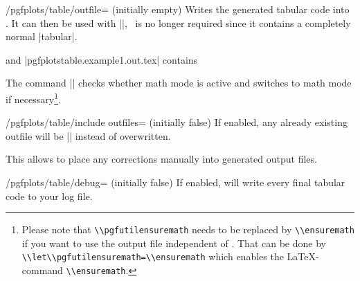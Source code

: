 \begin{key}{/pgfplots/table/outfile= (initially empty)}
	Writes the generated tabular code into . It can then be used with ||, \PGFPlotstable\ is no longer required since it contains a completely normal |tabular|.
\begin{codeexample}[]
\end{codeexample}
and |pgfplotstable.example1.out.tex| contains


The command |\pgfutilensuremath| checks whether math mode is active and switches to math mode if necessary\footnote{Please note that \lstinline{\\pgfutilensuremath} needs to be replaced by \lstinline{\\ensuremath} if you want to use the output file independent of \PGF. That can be done by \lstinline{\\let\\pgfutilensuremath=\\ensuremath} which enables the \LaTeX-command \lstinline{\\ensuremath}.}.
\end{key}

\begin{key}{/pgfplots/table/include outfiles= (initially false)}
	If enabled, any already existing outfile will be || instead of overwritten.
\begin{codeexample}
\end{codeexample}
	This allows to place any corrections manually into generated output files.
\end{key}

\begin{key}{/pgfplots/table/debug= (initially false)}
	If enabled, will write every final tabular code to your log file.
\end{key}

